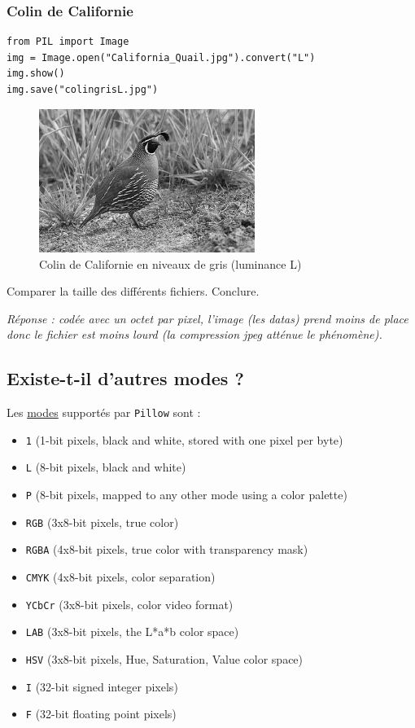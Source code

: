 \documentclass[11pt]{article}
\begin{document}
\subsubsection{Colin de Californie}
\label{sec:org5124523}

\begin{verbatim}
from PIL import Image
img = Image.open("California_Quail.jpg").convert("L")
img.show()
img.save("colingrisL.jpg")
\end{verbatim}


\begin{figure}[htbp]
\centering
\includegraphics[width=7cm]{colingrisL.jpg}
\caption{Colin de Californie en niveaux de gris (luminance L)}
\end{figure}

Comparer la taille des différents fichiers. Conclure.



\emph{Réponse : codée avec un octet par pixel, l'image (les datas) prend moins de place donc le fichier est moins lourd (la compression jpeg atténue le phénomène).}

\subsection{Existe-t-il d'autres modes ?}
\label{sec:orgde84d41}

Les \href{https://pillow.readthedocs.io/en/latest/handbook/concepts.html\#modes}{modes} supportés par \texttt{Pillow} sont : 

\begin{itemize}
\item \texttt{1} (1-bit pixels, black and white, stored with one pixel per byte)
\item \texttt{L} (8-bit pixels, black and white)
\item \texttt{P} (8-bit pixels, mapped to any other mode using a color palette)
\item \texttt{RGB} (3x8-bit pixels, true color)
\item \texttt{RGBA} (4x8-bit pixels, true color with transparency mask)
\item \texttt{CMYK} (4x8-bit pixels, color separation)
\item \texttt{YCbCr} (3x8-bit pixels, color video format)
\item \texttt{LAB} (3x8-bit pixels, the L*a*b color space)
\item \texttt{HSV} (3x8-bit pixels, Hue, Saturation, Value color space)
\item \texttt{I} (32-bit signed integer pixels)
\item \texttt{F} (32-bit floating point pixels)
\end{itemize}
\end{document}
